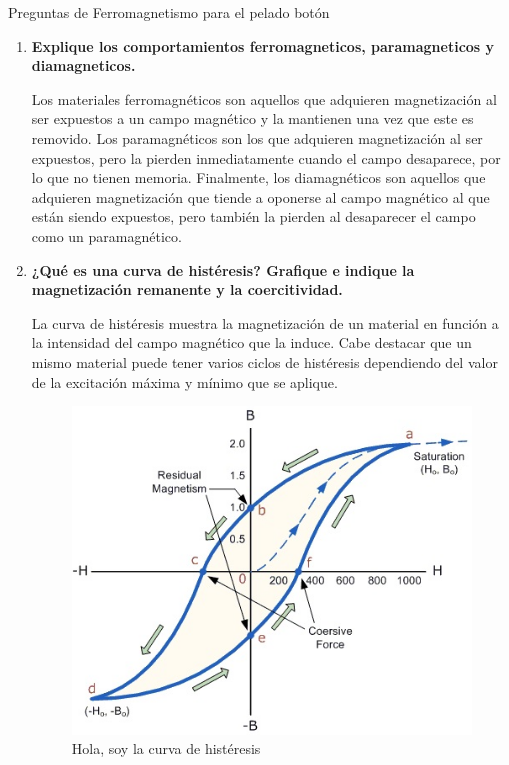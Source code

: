 \documentclass[a4paper,10pt,fleqn,oneside]{article}
\begin{document}


\bigskip
\noindent
\centering
Preguntas de Ferromagnetismo para el pelado botón


\begin{enumerate}[1.]
	\item \textbf{Explique los comportamientos ferromagneticos, paramagneticos y diamagneticos.}
		 
		 Los materiales ferromagnéticos son aquellos que adquieren magnetización al ser expuestos a un campo magnético y la mantienen una vez que este es removido. Los paramagnéticos son los que adquieren magnetización al ser expuestos, pero la pierden inmediatamente cuando el campo desaparece, por lo que no tienen memoria. Finalmente, los diamagnéticos son aquellos que adquieren magnetización que tiende a oponerse al campo magnético al que están siendo expuestos, pero también la pierden al desaparecer el campo como un paramagnético.
	\item \textbf{¿Qué es una curva de histéresis? Grafique e indique la magnetización remanente y la coercitividad.}
	
		La curva de histéresis muestra la magnetización de un material en función a la intensidad del campo magnético que la induce. Cabe destacar que un mismo material puede tener varios ciclos de histéresis dependiendo del valor de la excitación máxima y mínimo que se aplique.

\begin{figure}[h]
	\centering
	\includegraphics[scale=0.5]{histeresis.jpg}
	\caption{Hola, soy la curva de histéresis}
	\label{CH}
\end{figure}		
		

\end{enumerate}
\end{document}
